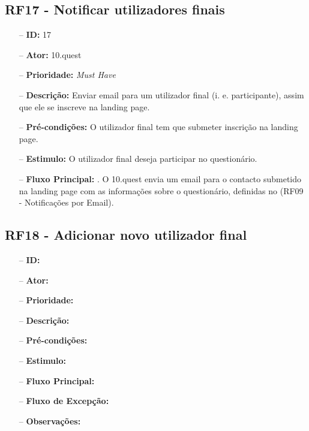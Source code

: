 \subsection{RF17 - Notificar utilizadores finais}
\begin{itemize}
	\item[--] \textbf{ID:} 17
	\item[--]  \textbf{Ator:} 10.quest
	\item[--]  \textbf{Prioridade:} \textit{Must Have}
	\item[--]  \textbf{Descrição:} Enviar email para um utilizador final (i. e. participante), assim que ele se inscreve na landing page.
	\item[--]  \textbf{Pré-condições:} O utilizador final tem que submeter inscrição na landing page.
	\item[--]  \textbf{Estimulo:} O utilizador final deseja participar no questionário.
	\item[--]  \textbf{Fluxo Principal:} 
		. O 10.quest envia um email para o contacto submetido na landing page com as informações sobre o questionário, definidas no (RF09 - Notificações por Email).
\end{itemize}
\newpage

\subsection{RF18 - Adicionar novo utilizador final}
\begin{itemize}
	\item[--] \textbf{ID:} 
	\item[--]  \textbf{Ator:} 
	\item[--]  \textbf{Prioridade:} 
	\item[--]  \textbf{Descrição:} 
	\item[--]  \textbf{Pré-condições:} 
	\item[--]  \textbf{Estimulo:}
	\item[--]  \textbf{Fluxo Principal:} 
	\subitem
	\subitem
	\subitem
	\subitem
	\item[--]  \textbf{Fluxo de Excepção:} 
	\subitem
	\subitem
	\subitem
	\subitem
	\item[--]  \textbf{Observações:} 
\end{itemize}
\newpage


